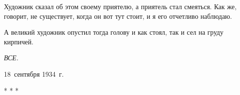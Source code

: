 Художник сказал об этом своему приятелю, а приятель стал смеяться. Как же, говорит, не существует, когда он вот тут стоит, и я его отчетливо наблюдаю.

А великий художник опустил тогда голову и как стоял, так и сел на груду кирпичей.

\begin{center}
\textit{ВСЕ.}
\end{center}

\begin{flushright}
18~сентября 1934~г.
\end{flushright}

\begin{center}
* * *
\end{center}